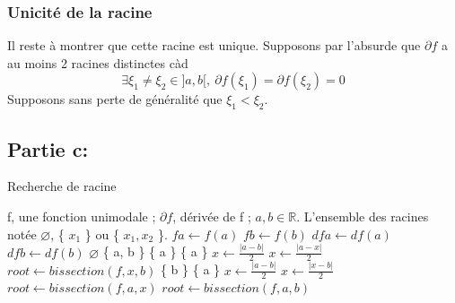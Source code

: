 \documentclass[a4paper, 12pt]{article}
\begin{document}
\subsubsection{Unicité de la racine}

Il reste à montrer que cette racine est unique. Supposons par l'absurde que \( \partial f \) a au moins 2 racines distinctes càd
$$
\exists \xi_1 \neq \xi_2 \in ]a, b[,~ \partial f(\xi_1) = \partial f(\xi_2) = 0
$$
Supposons sans perte de généralité que \( \xi_1 < \xi_2 \).


\newpage
\subsection{Partie c:}

\begin{algorithm}

\caption{Recherche de racine}
\label{Modele pour un algo}

\begin{algorithmic}

\REQUIRE f, une fonction unimodale ; \( \partial f \), dérivée de f ; \( a, b  \in \mathbb{R} \).
\ENSURE L'ensemble des racines notée \( \varnothing \), \{ \( x_1 \) \} ou \{ \( x_1, x_2 \) \}.
\STATE \( fa \leftarrow f(a) \)
\STATE \( fb \leftarrow f(b) \)
\STATE \( dfa \leftarrow df(a) \)
\STATE \( dfb \leftarrow df(b) \)
\RETURN \( \varnothing \)
\RETURN \{ a, b \}
\RETURN \{ a \}
\ELSE
{}
\RETURN \{ a \}
\ELSE
\STATE \( x \leftarrow \frac{|a-b|}{2} \)
\STATE \(x \leftarrow \frac{|a-x|}{2} \)
\ENDWHILE
\STATE \( root \leftarrow bissection(f, x, b) \)
\ENDIF
\ENDIF
\ELSE
{}
\RETURN \{ b \}
\ELSE
{}
\RETURN \{ a \}
\ELSE
\STATE \( x \leftarrow \frac{|a-b|}{2} \)
\STATE \(x \leftarrow \frac{|x-b|}{2} \)
\ENDWHILE
\STATE \( root \leftarrow bissection(f, a, x) \)
\ENDIF
\ENDIF
\ENDIF
\ELSE
\STATE \( root \leftarrow bissection(f, a, b) \)
\ENDIF

\end{algorithmic}

\end{algorithm}
\end{document}
